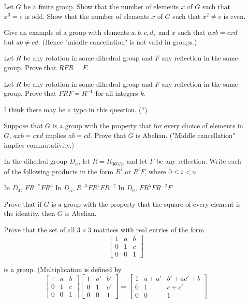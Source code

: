 \documentclass[11pt,largemargins]{homework}
\begin{document}
\question 
Let $G$ be a finite group. Show that the number of elements $x$ of $G$ such that $x^3=e$ is odd. Show that the number of 
elements $x$ of $G$ such that $x^2\neq e$ is even.

\question 
Give an example of a group with elements $a,b,c,d,$ and $x$ such that $axb=cxd$ but $ab\neq cd$. (Hence "middle cancellation" is 
not valid in groups.)

\question 
Let $R$ be any rotation in some dihedral group and $F$ any reflection in the same group. Prove that $RFR=F$.

\question 
Let $R$ be any rotation in some dihedral group and $F$ any reflection in the same group. Prove that $FRF=R^{-1}$ 
for all integers $k$.

\quad I think there may be a typo in this question. (?)

\question 
Suppose that $G$ is a group with the property that for every choice of elements in $G$, $axb=cxd$ implies $ab=cd$. Prove 
that $G$ is Abelian. ("Middle cancellation" implies commutativity.)

\question 
In the dihedral group $D_n$, let $R=R_{360/n}$ and let $F$ be any reflection. Write each of the following products in the 
form $R^i$ or $R^iF$, where $0\leq i < n$. 

\begin{alphaparts}
    \questionpart
    In $D_4$, $FR^{-2}FR^5$
    \questionpart
    In $D_5$, $R^{-3}FR^4FR^{-2}$
    \questionpart
    In $D_6$, $FR^5FR^{-2}F$
\end{alphaparts}
    

\question 
Prove that if $G$ is a group with the property that the square of every element is the identity, then $G$ is Abelian.

\question 
Prove that the set of all $3\times3$ matrices with real entries of the form
\[
\begin{bmatrix}
    1 & a & b \\
    0 & 1 & c \\
    0 & 0 & 1
\end{bmatrix}
\]

is a group. (Multiplication is defined by 
\[
\begin{bmatrix}
    1 & a & b \\
    0 & 1 & c \\
    0 & 0 & 1
\end{bmatrix}
\begin{bmatrix}
    1 & a' & b' \\
    0 & 1 & c' \\
    0 & 0 & 1
\end{bmatrix}
=
\begin{bmatrix}
    1 & a+a' & b'+ac'+b  \\
    0 & 1    & c+c' \\
    0 & 0    & 1
\end{bmatrix}
\]
\end{document}
